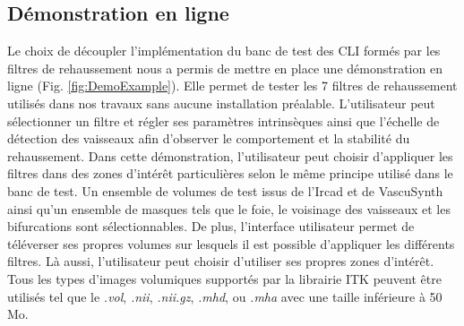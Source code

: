 \subsection{Démonstration en ligne}
Le choix de découpler l'implémentation du banc de test des CLI formés par les filtres de rehaussement nous a permis de mettre en place une démonstration en ligne (Fig. \ref{fig:DemoExample}). Elle permet de tester les 7 filtres de rehaussement utilisés dans nos travaux sans aucune installation préalable. L'utilisateur peut sélectionner un filtre et régler ses paramètres intrinsèques ainsi que l'échelle de détection des vaisseaux afin d'observer le comportement et la stabilité du rehaussement. Dans cette démonstration, l'utilisateur peut choisir d'appliquer les filtres dans des zones d'intérêt particulières selon le même principe utilisé dans le banc de test. Un ensemble de volumes de test issus de l'Ircad et de VascuSynth ainsi qu'un ensemble de masques tels que le foie, le voisinage des vaisseaux et les bifurcations sont sélectionnables. De plus, l'interface utilisateur permet de téléverser ses propres volumes sur lesquels il est possible d’appliquer les différents filtres. Là aussi, l'utilisateur peut choisir d'utiliser ses propres zones d'intérêt. Tous les types d'images volumiques supportés par la librairie ITK peuvent être utilisés tel que le \textit{.vol}, \textit{.nii}, \textit{.nii.gz}, \textit{.mhd}, ou \textit{.mha} avec une taille inférieure à 50 Mo.
